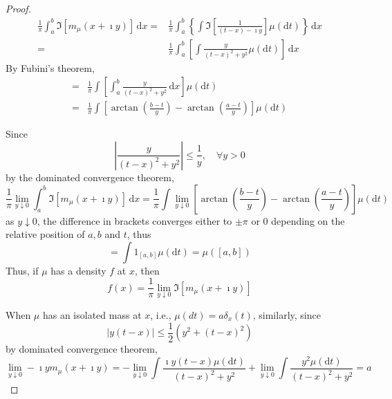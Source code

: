 \begin{proof}
	\begin{equation*}
		\begin{aligned}
			\frac{1}{\pi}\int_{a}^{b}\Im\left[m_{\mu}(x+\imath y)\right]\,\mathrm{d}x= & \frac{1}{\pi}\int_{a}^{b}\left\{\int\Im\left[\frac{1}{(t-x)-\imath y}\right]\mu(\mathrm{d}t)\right\}\,\mathrm{d}x \\
			=                                                                          & \frac{1}{\pi}\int_{a}^{b}\left[\int\frac{y}{(t-x)^{2}+y^{2}}\mu(\mathrm{d}t)\right]\,\mathrm{d}x
		\end{aligned}
	\end{equation*}
	By Fubini's theorem,
	\begin{equation*}
		\begin{aligned}
			= & \frac{1}{\pi}\int\left[\int_{a}^{b}\frac{y}{(t-x)^{2}+y^{2}}\,\mathrm{d}x\right]\mu(\mathrm{d}t)                  \\
			= & \frac{1}{\pi}\int\left[\arctan\left(\frac{b-t}{y}\right)-\arctan\left(\frac{a-t}{y}\right)\right]\mu(\mathrm{d}t)
		\end{aligned}
	\end{equation*}

	Since
	\begin{equation*}
		\left|\frac{y}{(t-x)^{2}+y^{2}}\right|\leq\frac{1}{y},\quad\forall y>0
	\end{equation*}
	by the dominated convergence theorem,
	\begin{equation*}
		\frac{1}{\pi}\lim_{y\downarrow 0}\int_{a}^{b}\Im\left[m_{\mu}(x+\imath y)\right]\,\mathrm{d}x=\frac{1}{\pi}\int\lim_{y\downarrow 0}\left[\arctan\left(\frac{b-t}{y}\right)-\arctan\left(\frac{a-t}{y}\right)\right]\mu(\mathrm{d}t)
	\end{equation*}
	as $y\downarrow 0$, the difference in brackets converges either to $\pm \pi$ or 0 depending on the relative position of $a,b$ and $t$, thus
	\begin{equation*}
		=\int\mathrm{1}_{[a,b]}\mu(\mathrm{d}t)=\mu\left([a,b]\right)
	\end{equation*}
	Thus, if $\mu$ has a density $f$ at $x$, then
	\begin{equation*}
		f(x)=\frac{1}{\pi}\lim_{y\downarrow 0}\Im\left[m_{\mu}(x+\imath y)\right]
	\end{equation*}

	When $\mu$ has an isolated mass at $x$, i.e., $\mu(d t)=a \delta_{x}(t)$, similarly, since
	\begin{equation*}
		|y(t-x)|\leq\frac{1}{2}\left(y^{2}+(t-x)^{2}\right)
	\end{equation*}
	by dominated convergence theorem,
	\begin{equation*}
		\lim_{y\downarrow 0}-\imath ym_{\mu}(x+\imath y)=-\lim_{y\downarrow 0}\int\frac{\imath y(t-x)\mu(\mathrm{d}t)}{(t-x)^{2}+y^{2}}+\lim_{y\downarrow 0}\int\frac{y^{2}\mu(\mathrm{d}t)}{(t-x)^{2}+y^{2}}=a
	\end{equation*}
\end{proof}

